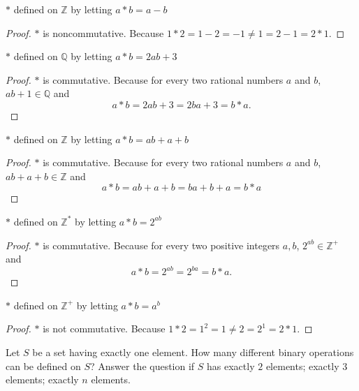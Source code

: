 \begin{exercise}
    $*$ defined on $\mathbb{Z}$ by letting $a * b = a - b$
\end{exercise}

\begin{proof}
    $*$ is noncommutative. Because $1 * 2 = 1 - 2 = -1 \ne 1 = 2 - 1 = 2 * 1$.
\end{proof}

\begin{exercise}
    $*$ defined on $\mathbb{Q}$ by letting $a * b = 2ab + 3$
\end{exercise}

\begin{proof}
    $*$ is commutative. Because for every two rational numbers $a$ and $b$, $ab + 1\in\mathbb{Q}$ and
    \[
        a * b = 2ab + 3 = 2ba + 3 = b * a.
    \]
\end{proof}

\begin{exercise}
    $*$ defined on $\mathbb{Z}$ by letting $a * b = ab + a + b$
\end{exercise}

\begin{proof}
    $*$ is commutative. Because for every two rational numbers $a$ and $b$, $ab + a + b\in\mathbb{Z}$ and
    \[
        a * b = ab + a + b = ba + b + a = b * a
    \]
\end{proof}

\begin{exercise}
    $*$ defined on $\mathbb{Z}^{*}$ by letting $a * b = 2^{ab}$
\end{exercise}

\begin{proof}
    $*$ is commutative. Because for every two positive integers $a, b$, $2^{ab}\in\mathbb{Z}^{+}$ and
    \[
        a * b = 2^{ab} = 2^{ba} = b * a.
    \]
\end{proof}

\begin{exercise}
    $*$ defined on $\mathbb{Z}^{+}$ by letting $a * b = a^{b}$
\end{exercise}

\begin{proof}
    $*$ is not commutative. Because $1 * 2 = 1^{2} = 1 \ne 2 = 2^{1} = 2 * 1$.
\end{proof}

\begin{exercise}
    Let $S$ be a set having exactly one element. How many different binary operations can be defined on $S$? Answer the question if $S$ has exactly $2$ elements; exactly $3$ elements; exactly $n$ elements.
\end{exercise}

